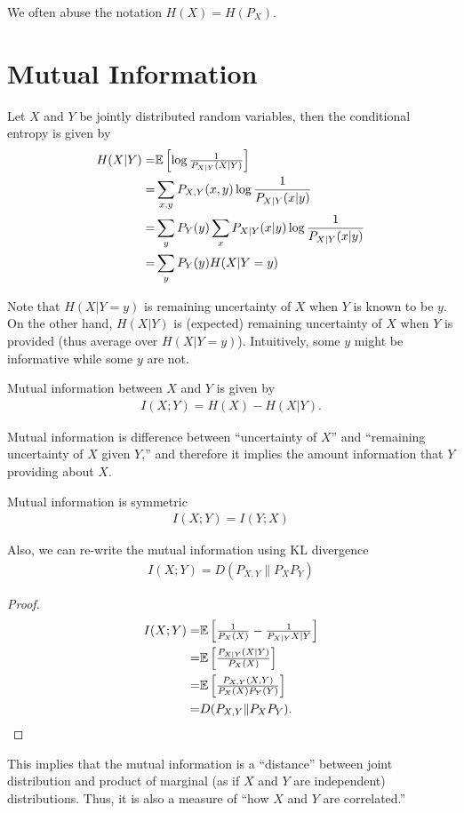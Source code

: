 \documentclass{article}
\begin{document}
\begin{remark}
    We often abuse the notation $H(X) = H(P_X)$.
\end{remark}


\section{Mutual Information}
\begin{definition}
   Let $X$ and $Y$ be jointly distributed random variables, then the conditional entropy is given by
   \begin{align}
       H(X|Y) =& \Expec{\log\frac{1}{P_{X|Y}(X|Y)}}\\
       =& \sum_{x, y} P_{X, Y}(x, y) \log\frac{1}{P_{X|Y}(x|y)}\\
       =& \sum_{y} P_{Y}(y)\sum_x P_{X|Y}(x|y) \log\frac{1}{P_{X|Y}(x|y)}\\
       =& \sum_{y} P_{Y}(y) H(X|Y=y)
   \end{align}
\end{definition}
Note that $H(X|Y=y)$ is remaining uncertainty of $X$ when $Y$ is known to be $y$.
On the other hand, $H(X|Y)$ is (expected) remaining uncertainty of $X$ when $Y$ is provided (thus average over $H(X|Y=y)$).
Intuitively, some $y$ might be informative while some $y$ are not.

\begin{definition}
    Mutual information between $X$ and $Y$ is given by
    \begin{align}
        I(X;Y) = H(X) - H(X|Y).
    \end{align}
\end{definition}
Mutual information is difference between ``uncertainty of $X$'' and ``remaining uncertainty of $X$ given $Y$,''
and therefore it implies the amount information that $Y$ providing about $X$.

\begin{lemma}
    Mutual information is symmetric
    \begin{align}
        I(X;Y) = I(Y;X)
    \end{align}
\end{lemma}

Also, we can re-write the mutual information using KL divergence
\begin{align}
    I(X;Y) = D(P_{X, Y} \| P_X P_Y)
\end{align}
\begin{proof}
\begin{align}
    I(X;Y) =& \Expec{\frac{1}{P_{X}(X)} - \frac{1}{P_{X|Y}{X|Y}}}\\
=& \Expec{\frac{P_{X|Y}(X|Y)}{P_{X}(X)}}\\
=& \Expec{\frac{P_{X,Y}(X,Y)}{P_{X}(X)P_{Y}(Y)}}\\
=& D(P_{X,Y}\|P_X P_Y).
\end{align}
\end{proof}
This implies that the mutual information is a ``distance'' between joint distribution and product of marginal (as if $X$ and $Y$ are independent) distributions.
Thus, it is also a measure of ``how $X$ and $Y$ are correlated.''




\end{document}
